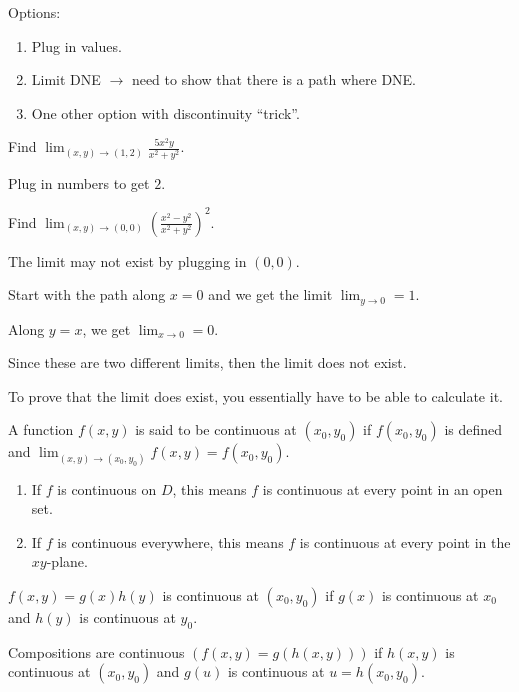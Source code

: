 \documentclass[../calc3.tex]{subfiles}
\begin{document}
Options:
\begin{enumerate}
    \item Plug in values.
    \item Limit DNE $\rightarrow$ need to show that there is a path where DNE.
    \item One other option with discontinuity ``trick''.
\end{enumerate}

\begin{example}
    Find $\lim_{(x,y)\rightarrow (1,2)}\frac{5x^2y}{x^2+y^2}$.

    Plug in numbers to get $2$.
\end{example}

\begin{example}
    Find $\lim_{(x,y)\to (0,0)}\left(\frac{x^2-y^2}{x^2+y^2}\right)^2$.

    The limit may not exist by plugging in $(0,0)$.

    Start with the path along $x=0$ and we get the limit $\lim_{y\to 0}=1$.

    Along $y=x$, we get $\lim_{x\to 0}=0$.

    Since these are two different limits, then the limit does not exist.
\end{example}

To prove that the limit does exist, you essentially have to be able to calculate it.

\begin{definition}
    A function $f(x,y)$ is said to be continuous at $(x_0,y_0)$ if $f(x_0,y_0)$ is defined and $\lim_{(x,y)\to (x_0,y_0)}f(x,y)=f(x_0,y_0)$.

    \begin{enumerate}
        \item If $f$ is continuous on $D$, this means $f$ is continuous at every point in an open set.
        \item If $f$ is continuous everywhere, this means $f$ is continuous at every point in the $xy$-plane.
    \end{enumerate}
\end{definition}

\begin{theorem}
    $f(x,y)=g(x)h(y)$ is  continuous at $(x_0,y_0)$ if $g(x)$ is continuous at $x_0$ and $h(y)$ is continuous at $y_0$.

    Compositions are continuous $(f(x,y)=g(h(x,y)))$ if $h(x,y)$ is continuous at $(x_0,y_0)$ and $g(u)$ is continuous at $u=h(x_0,y_0)$.
\end{theorem}
\end{document}
